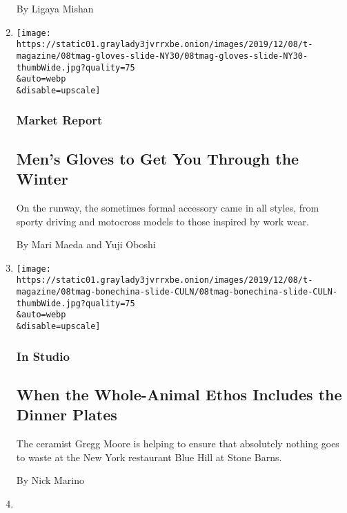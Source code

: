 \begin{enumerate}
  By Ligaya Mishan
\item
  \href{/2019/12/05/t-magazine/mens-gloves.html}{}

  \texttt{[image: https://static01.graylady3jvrrxbe.onion/images/2019/12/08/t-magazine/08tmag-gloves-slide-NY30/08tmag-gloves-slide-NY30-thumbWide.jpg?quality=75\\\&auto=webp\\\&disable=upscale]}

  \hypertarget{market-report}{%
  \subsubsection{Market Report}\label{market-report}}

  \hypertarget{mens-gloves-to-get-you-through-the-winter}{%
  \subsection{Men's Gloves to Get You Through the
  Winter}\label{mens-gloves-to-get-you-through-the-winter}}

  On the runway, the sometimes formal accessory came in all styles, from
  sporty driving and motocross models to those inspired by work wear.

  By Mari Maeda and Yuji Oboshi
\item
  \href{/2019/12/05/t-magazine/blue-hill-gregg-moore-ceramics.html}{}

  \texttt{[image: https://static01.graylady3jvrrxbe.onion/images/2019/12/08/t-magazine/08tmag-bonechina-slide-CULN/08tmag-bonechina-slide-CULN-thumbWide.jpg?quality=75\\\&auto=webp\\\&disable=upscale]}

  \hypertarget{in-studio}{%
  \subsubsection{In Studio}\label{in-studio}}

  \hypertarget{when-the-whole-animal-ethos-includes-the-dinner-plates}{%
  \subsection{When the Whole-Animal Ethos Includes the Dinner
  Plates}\label{when-the-whole-animal-ethos-includes-the-dinner-plates}}

  The ceramist Gregg Moore is helping to ensure that absolutely nothing
  goes to waste at the New York restaurant Blue Hill at Stone Barns.

  By Nick Marino
\item
  \href{/2019/12/04/t-magazine/park-hyatt-kyoto.html}{}


\end{enumerate}
